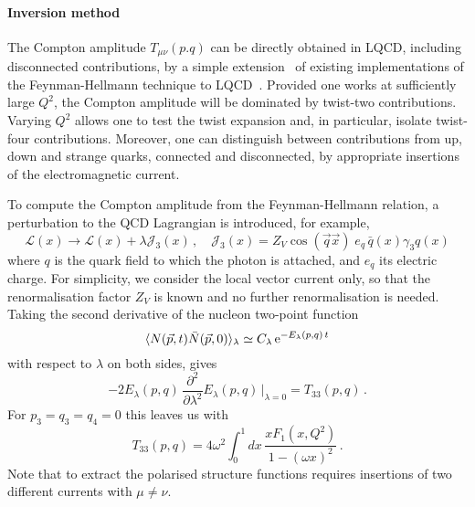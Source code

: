 \paragraph*{Inversion method}

The Compton amplitude $T_{\mu\nu}(p.q)$ can be directly obtained in LQCD, including disconnected contributions,  by a simple extension~\cite{Chambers:2017dov} of existing implementations of the Feynman-Hellmann technique to LQCD~\cite{Horsley:2012pz,Chambers:2014qaa,Chambers:2015bka}. Provided one works at sufficiently large $Q^2$, the Compton amplitude will be dominated by twist-two contributions. Varying $Q^2$ allows one to test the twist expansion and, in particular, isolate twist-four contributions. Moreover, one can distinguish between contributions from up, down and strange quarks, connected and disconnected, by appropriate insertions of the electromagnetic current. %

To compute the Compton amplitude from the Feynman-Hellmann relation, a perturbation to the QCD Lagrangian is introduced, for example,
\begin{equation}
\mathcal{L}(x) \rightarrow \mathcal{L}(x) + \lambda \mathcal{J}_3(x)\,, \quad \mathcal{J}_3(x)=Z_V\cos(\vec{q}\vec{x})\; e_q \,\bar{q}(x)\gamma_3 q(x) 
\label{in}
\end{equation}
where $q$ is the quark field to which the photon is attached, and $e_q$ its electric charge. For simplicity, we consider the local vector current only, so that the renormalisation factor $Z_V$ is known and no further renormalisation is needed. Taking the second derivative of the nucleon two-point function 
\begin{equation}
\langle N(\vec{p},t) \bar{N}(\vec{p},0)\rangle_\lambda \simeq C_\lambda\, {\rm e}^{-E_\lambda(p,q)\,t}
\end{equation}
with respect to $\lambda$ on both sides, gives
\begin{equation}
-2 E_\lambda(p,q)\, \frac{\partial^2}{\partial\lambda^2}  E_\lambda(p,q)\,\big|_{\lambda=0} = T_{33}(p,q) \,.
\end{equation}
For $p_3=q_3=q_4=0$ this leaves us with
\begin{equation}
T_{33}(p,q) = 4 \omega^2 \int_0^1 dx\,  \frac{xF_1(x,Q^2)}{1-(\omega x)^2} \,.
\label{ff}
\end{equation}
Note that to extract the polarised structure functions requires insertions of two different currents with $\mu\neq \nu$.  

